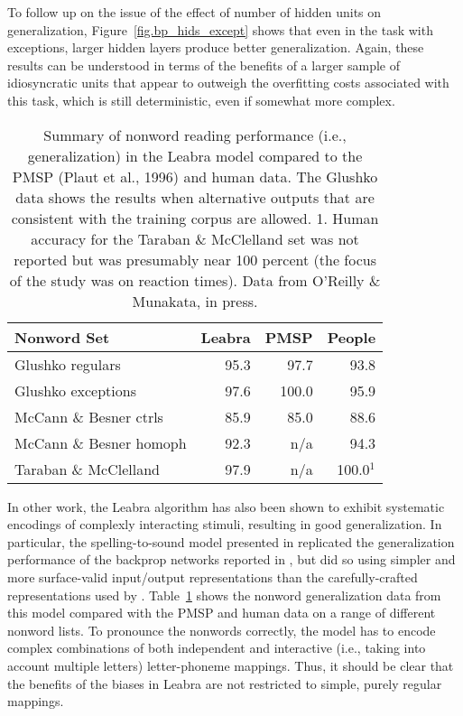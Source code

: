 \documentclass[12pt,twoside]{article}
\begin{document}
To follow up on the issue of the effect of number of hidden units on
generalization, Figure~\ref{fig.bp_hids_except} shows that even in the
task with exceptions, larger hidden layers produce better
generalization.  Again, these results can be understood in terms of
the benefits of a larger sample of idiosyncratic units that appear to
outweigh the overfitting costs associated with this task, which is
still deterministic, even if somewhat more complex.

\begin{table}
  \centering
  \begin{tabular}{lrrr} \hline
Nonword Set                    & Leabra & PMSP & People \\ \hline
Glushko regulars               & 95.3  & 97.7 & 93.8 \\
Glushko exceptions             & 97.6  & 100.0 & 95.9 \\
McCann \& Besner ctrls         & 85.9  & 85.0 & 88.6 \\
McCann \& Besner homoph        & 92.3  & n/a  & 94.3 \\
Taraban \& McClelland          & 97.9  & n/a  & 100.0$^1$ \\ \hline
  \end{tabular}
  \caption{\small Summary of nonword reading performance (i.e.,
    generalization) in the Leabra model compared to the PMSP (Plaut et
    al., 1996) and human data. The Glushko data shows the results when
    alternative outputs that are consistent with the training corpus
    are allowed.  1. Human accuracy for the Taraban \& McClelland set
    was not reported but was presumably near 100 percent (the focus of
    the study was on reaction times).  Data from O'Reilly \& Munakata,
    in press.} 
  \label{tab.nonwords}
\end{table}

In other work, the Leabra algorithm has also been shown to exhibit
systematic encodings of complexly interacting stimuli, resulting in
good generalization.  In particular, the spelling-to-sound model
presented in  replicated the generalization
performance of the backprop networks reported in
, but did so using
simpler and more surface-valid input/output representations than the
carefully-crafted representations used by
.
Table~\ref{tab.nonwords} shows the nonword generalization data from
this model compared with the PMSP
\cite{PlautMcClellandSeidenbergPatterson96} and human data on a range
of different nonword lists.  To pronounce the nonwords correctly, the
model has to encode complex combinations of both independent and
interactive (i.e., taking into account multiple letters)
letter-phoneme mappings.  Thus, it should be clear that the benefits
of the biases in Leabra are not restricted to simple, purely regular
mappings.
\end{document}
